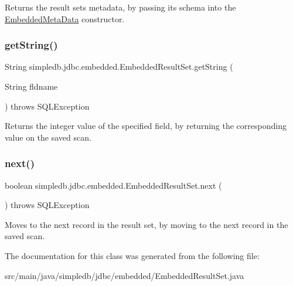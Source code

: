 Returns the result set\textquotesingle{}s metadata, by passing its schema into the \hyperlink{classsimpledb_1_1jdbc_1_1embedded_1_1EmbeddedMetaData}{Embedded\+Meta\+Data} constructor. \mbox{\label{classsimpledb_1_1jdbc_1_1embedded_1_1EmbeddedResultSet_ab98291535370c4200baad93bab9e8d58}} 
\subsubsection{\texorpdfstring{get\+String()}{getString()}}
{\footnotesize\ttfamily String simpledb.\+jdbc.\+embedded.\+Embedded\+Result\+Set.\+get\+String (\begin{DoxyParamCaption}\item[{String}]{fldname }\end{DoxyParamCaption}) throws S\+Q\+L\+Exception\hspace{0.3cm}{\ttfamily [inline]}}

Returns the integer value of the specified field, by returning the corresponding value on the saved scan. \mbox{\label{classsimpledb_1_1jdbc_1_1embedded_1_1EmbeddedResultSet_a9d8476584bd75cdb7bad151ed5977511}} 
\subsubsection{\texorpdfstring{next()}{next()}}
{\footnotesize\ttfamily boolean simpledb.\+jdbc.\+embedded.\+Embedded\+Result\+Set.\+next (\begin{DoxyParamCaption}{ }\end{DoxyParamCaption}) throws S\+Q\+L\+Exception\hspace{0.3cm}{\ttfamily [inline]}}

Moves to the next record in the result set, by moving to the next record in the saved scan. 

The documentation for this class was generated from the following file\+:\begin{DoxyCompactItemize}
\item 
src/main/java/simpledb/jdbc/embedded/Embedded\+Result\+Set.\+java\end{DoxyCompactItemize}
